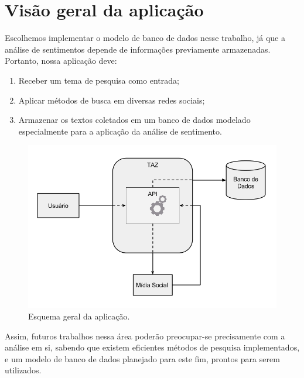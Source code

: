 \section{Visão geral da aplicação}
\label{sec: visaoGeralDaAplicacao}
Escolhemos implementar o modelo de banco de dados nesse trabalho, já que a análise de sentimentos depende de informações previamente armazenadas.
Portanto, nossa aplicação deve:
\begin{enumerate}
    \item Receber um tema de pesquisa como entrada;
    \item Aplicar métodos de busca em diversas redes sociais;
    \item Armazenar os textos coletados em um banco de dados modelado especialmente para a aplicação da análise de sentimento.
\end{enumerate}

\begin{figure}[ht]
  \centering
  \includegraphics[width=.8\textwidth]{images/esquema}
 
  \caption{Esquema geral da aplicação.}
  \label{fig:esquema}
\end{figure}

Assim, futuros trabalhos nessa área poderão preocupar-se precisamente com a análise em si, sabendo que existem eficientes métodos de pesquisa implementados, e um modelo de banco de dados planejado para este fim, prontos para serem utilizados.